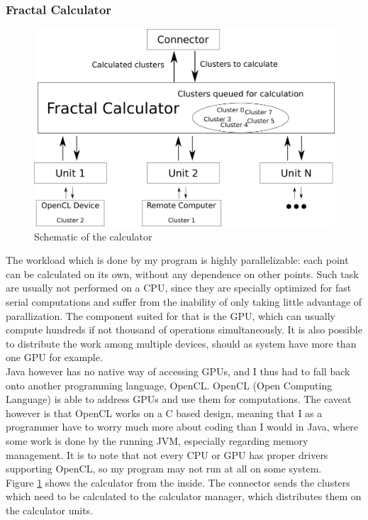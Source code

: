 \documentclass[10pt,a4paper,titlepage]{article}
\begin{document}
	\subsubsection{Fractal Calculator}
	\begin{figure}
		\caption{Schematic of the calculator}
		\label{fig:calculator_schematic}
		\centering
		\includegraphics[width=\textwidth]{res/images/calculator.png}
	\end{figure}
	The workload which is done by my program is highly parallelizable: each point can be calculated on its own, without any dependence on other points. Such task are usually not performed on a CPU, since they are specially optimized for fast serial computations and suffer from the inability of only taking little advantage of parallization. The component suited for that is the GPU, which can usually compute hundreds if not thousand of operations simultaneously. It is also possible to distribute the work among multiple devices, should as system have more than one GPU for example.\\
	Java however has no native way of accessing GPUs, and I thus had to fall back onto another programming language, OpenCL. OpenCL (Open Computing Language) is able to address GPUs and use them for computations. The caveat however is that OpenCL works on a C based design, meaning that I as a programmer have to worry much more about coding than I would in Java, where some work is done by the running JVM, especially regarding memory management. It is to note that not every CPU or GPU has proper drivers supporting OpenCL, so my program may not run at all on some system.\\
	Figure \ref{fig:calculator_schematic} shows the calculator from the inside. The connector sends the clusters which need to be calculated to the calculator manager, which distributes them on the calculator units.
\end{document}
